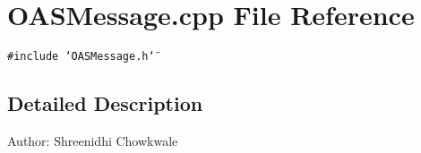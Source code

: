 \section{OASMessage.cpp File Reference}
\label{OASMessage_8cpp}
{\tt \#include \char`\"{}OASMessage.h\char`\"{}}\par


\subsection{Detailed Description}
\begin{Desc}
\item[Author:]Shreenidhi Chowkwale \end{Desc}
